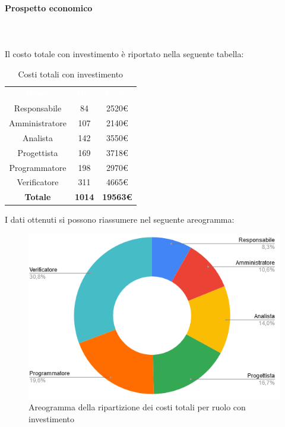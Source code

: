 \paragraph{Prospetto economico} \mbox{} \\ \mbox{} \\
Il costo totale con investimento è riportato nella seguente tabella:

\begin{table}[H]
\centering\renewcommand{\arraystretch}{1.5}
\caption{Costi totali con investimento}
\vspace{0.2cm}
\begin{tabular}{ c c c }
\rowcolor{redafk}
\textcolor{white}{\textbf{Ruolo}} & \textcolor{white}{\textbf{Ore}} & 
\textcolor{white}{\textbf{Costo}}  \\
Responsabile & 84 & 2520€ \\
Amministratore & 107 & 2140€ \\
Analista & 142 & 3550€ \\
Progettista	& 169 & 3718€ \\
Programmatore & 198 & 2970€  \\
Verificatore & 311 & 4665€  \\
\rowcolor{lastrowcolor}
\textbf{Totale} & \textbf{1014} & \textbf{19563€}  \\
\end{tabular}
\end{table}

I dati ottenuti si possono riassumere nel seguente areogramma:
\begin{figure}[H]
\centering
\includegraphics[scale=0.60]{img/grafici/torta_tot_con_analisi.png}
\caption{Areogramma della ripartizione dei costi totali per ruolo con investimento}
\end{figure}

